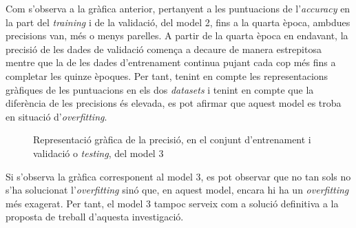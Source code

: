 \documentclass[a4paper,12pt]{article}
\begin{document}
Com s'observa a la gràfica anterior, pertanyent a les puntuacions de l'\textit{accuracy} en la part del \textit{training} i de la validació, del model 2, fins a la quarta època, ambdues precisions van, més o menys parelles. A partir de la quarta època en endavant, la precisió de les dades de validació comença a decaure de manera estrepitosa mentre que la de les dades d'entrenament continua pujant cada cop més fins a completar les quinze èpoques. Per tant, tenint en compte les representacions gràfiques de les puntuacions en els dos \textit{datasets} i tenint en compte que la diferència de les precisions és elevada, es pot afirmar que aquest model es troba en situació d'\textit{overfitting}.
\begin{figure}[H]
    \centering
    \caption{Representació gràfica de la precisió, en el conjunt d'entrenament i validació o \textit{testing}, del model 3}
    \label{fig:model3}
\end{figure}
Si s'observa la gràfica corresponent al model 3, es pot observar que no tan sols no s'ha solucionat l'\textit{overfitting} sinó que, en aquest model, encara hi ha un \textit{overfitting} més exagerat. Per tant, el model 3 tampoc serveix com a solució definitiva a la proposta de treball d'aquesta investigació.
\end{document}
